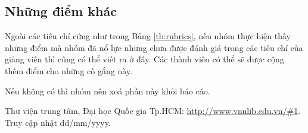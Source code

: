 \documentclass[a4paper]{article}
\begin{document}
\subsection{Những điểm khác}
Ngoài các tiêu chí cứng như trong Bảng \ref{tb:rubrics}, nếu nhóm thực hiện thấy những điểm mà nhóm đã nổ lực nhưng chưa được đánh giá trong các tiêu chí của giảng viên thì cũng có thể viết ra ở đây. Các thành viên có thể sẽ được cộng thêm điểm cho những cố gắng này.

Nếu không có thì nhóm nên xoá phần này khỏi báo cáo.




\begin{thebibliography}{99999}
 {Thư viện trung tâm, Đại học Quốc gia Tp.HCM: \url{http://www.vnulib.edu.vn/#1}}. Truy cập nhật dd/mm/yyyy.


\end{thebibliography} 
\end{document}
